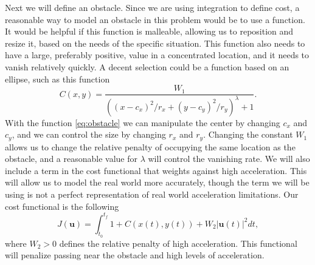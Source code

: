 Next we will define an obstacle.
Since we are using integration to define cost, a reasonable way to model an obstacle in this problem would be to use a function.
It would be helpful if this function is malleable, allowing us to reposition and resize it, based on the needs of the specific situation.
This function also needs to have a large, preferably positive, value in a concentrated location, and it needs to vanish relatively quickly.
A decent selection could be a function based on an ellipse, such as this function
\begin{equation}\label{eq:obstacle}
    C(x,y) = \frac{W_1}{((x-c_x)^2 / r_x + (y - c_y)^2 / r_y)^\lambda + 1}.
\end{equation}
With the function \ref{eq:obstacle} we can manipulate the center by changing $c_x$ and $c_y$, and we can control the size by changing $r_x$ and $r_y$.
Changing the constant $W_1$ allows us to change the relative penalty of occupying the same location as the obstacle, and a reasonable value for $\lambda$ will control the vanishing rate.
We will also include a term in the cost functional that weights against high acceleration.
This will allow us to model the real world more accurately, though the term we will be using is not a perfect representation of real world acceleration limitations.
Our cost functional is the following
\begin{equation}\label{eq:ex-cost-func}
    J(\boldsymbol{u}) = \int_{t_0}^{t_f}1 + C(x(t),y(t)) + W_2\left|\boldsymbol{u}(t)\right|^2 dt,
\end{equation}
where $W_2>0$ defines the relative penalty of high acceleration.
This functional will penalize passing near the obstacle and high levels of acceleration.

